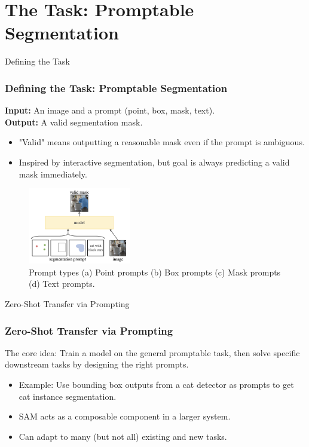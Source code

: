 \documentclass{beamer}
\begin{document}
\section{The Task: Promptable Segmentation}

\begin{frame}{Defining the Task}
    \frametitle{Defining the Task: Promptable Segmentation}
    \textbf{Input:} An image and a prompt (point, box, mask, text). \\
    \textbf{Output:} A valid segmentation mask.
    \begin{itemize}
        \item "Valid" means outputting a reasonable mask even if the prompt is ambiguous.
        \item Inspired by interactive segmentation, but goal is always predicting a valid mask immediately.
    \end{itemize}
    \vfill
    
    \begin{figure}
        \centering
        \includegraphics[width=0.4\textwidth]{figures/prompt_types.png}
        \caption{Prompt types (a) Point prompts (b) Box prompts (c) Mask prompts (d) Text prompts.}
    \end{figure}
\end{frame}

\begin{frame}{Zero-Shot Transfer via Prompting}
    \frametitle{Zero-Shot Transfer via Prompting}
    The core idea: Train a model on the general promptable task, then solve specific downstream tasks by designing the right prompts.
    \begin{itemize}
        \item Example: Use bounding box outputs from a cat detector as prompts to get cat instance segmentation.
        \item SAM acts as a composable component in a larger system.
        \item Can adapt to many (but not all) existing and new tasks.
    \end{itemize}
\end{frame}
\end{document}
